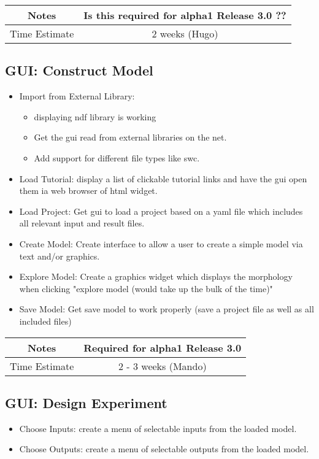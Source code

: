 \documentclass[12pt]{article}
\begin{document}
{
  \vspace{5mm}
  \centering
  \begin{tabular}{|c|c|}
    \hline
    Notes
    & Is this required for alpha1 Release 3.0 ?? \\
    \hline
    Time Estimate
    & 2 weeks (Hugo) \\
    \hline
  \end{tabular}
}


\subsection{GUI: Construct Model}

\begin{itemize}
\item Import from External Library:
  \begin{itemize}
  \item displaying ndf library is working
  \item Get the gui read from external libraries on the net.
  \item Add support for different file types like swc.
  \end{itemize}
\item Load Tutorial: display a list of clickable tutorial links and
  have the gui open them ia web browser of html widget.
\item Load Project: Get gui to load a project based on a yaml file
  which includes all relevant input and result files.
\item Create Model: Create interface to allow a user to create a
  simple model via text and/or graphics.
\item Explore Model: Create a graphics widget which displays the
  morphology when clicking "explore model (would take up the bulk of the time)"
\item Save Model: Get save model to work properly (save a project file
  as well as all included files)
\end{itemize}

{
  \vspace{5mm}
  \centering
  \begin{tabular}{|c|c|}
    \hline
    Notes
    & Required for alpha1 Release 3.0 \\
    \hline
    Time Estimate
    & 2 - 3 weeks (Mando) \\
    \hline
  \end{tabular}
}


\subsection{GUI: Design Experiment}
\begin{itemize}
\item Choose Inputs: create a menu of selectable inputs from the loaded model.
\item Choose Outputs: create a menu of selectable outputs from the loaded model.
\end{itemize}
\end{document}
